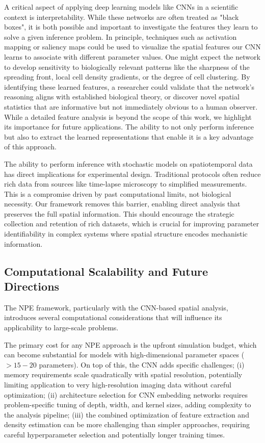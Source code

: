 \documentclass{article}
\begin{document}
A critical aspect of applying deep learning models like CNNs in a scientific context is interpretability. While these networks are often treated as "black boxes", it is both possible and important to investigate the features they learn to solve a given inference problem. In principle, techniques such as activation mapping \cite{2023arXiv230914304M} or saliency maps \citep{2019arXiv191111293M} could be used to visualize the spatial features our CNN learns to associate with different parameter values.  One might expect the network to develop sensitivity to biologically relevant patterns like the sharpness of the spreading front, local cell density gradients, or the degree of cell clustering. By identifying these learned features, a researcher could validate that the network's reasoning aligns with established biological theory, or discover novel spatial statistics that are informative but not immediately obvious to a human observer. While a detailed feature analysis is beyond the scope of this work, we highlight its importance for future applications. The ability to not only perform inference but also to extract the learned representations that enable it is a key advantage of this approach. 

The ability to perform inference with stochastic models on spatiotemporal data has direct implications for experimental design. Traditional protocols often reduce rich data from sources like time-lapse microscopy to simplified measurements. This is a compromise driven by past computational limits, not biological necessity. Our framework removes this barrier, enabling direct analysis that preserves the full spatial information. This should encourage the strategic collection and retention of rich datasets, which is crucial for improving parameter identifiability in complex systems where spatial structure encodes mechanistic information.




\subsection{Computational Scalability and Future Directions}
The NPE framework, particularly with the CNN-based spatial analysis, introduces several computational considerations that will influence its applicability to large-scale problems.

The primary cost for any NPE approach is the upfront simulation budget, which can become substantial for models with high-dimensional parameter spaces ($> 15-20$ parameters). On top of this, the CNN adds specific challenges; (i) memory requirements scale quadratically with spatial resolution, potentially limiting application to very high-resolution imaging data without careful optimization; (ii) architecture selection for CNN embedding networks requires problem-specific tuning of depth, width, and kernel sizes, adding complexity to the analysis pipeline; (iii) the combined optimization of feature extraction and density estimation can be more challenging than simpler approaches, requiring careful hyperparameter selection and potentially longer training times.
\end{document}
